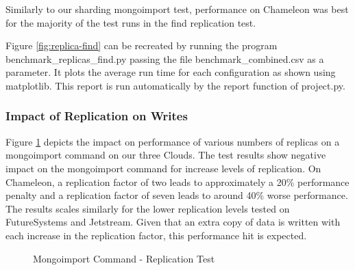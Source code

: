 \documentclass[9pt,twocolumn,twoside]{../../styles/osajnl}
\begin{document}
Similarly to our sharding mongoimport test, performance on Chameleon was best for the majority of the test runs in the find replication test.

Figure \ref{fig:replica-find} can be recreated by running the program benchmark\_replicas\_find.py passing the file benchmark\_combined.csv as a parameter.  It plots the average run time for each configuration as shown using matplotlib. This report is run automatically by the report function of project.py.



\subsubsection{Impact of Replication on Writes}



Figure \ref{fig:replica-import} depicts the impact on performance of various numbers of replicas on a mongoimport command on our three Clouds.  The test results show negative impact on the mongoimport command for increase levels of replication.  On Chameleon, a replication factor of two leads to approximately a 20\% performance penalty and a replication factor of seven leads to around 40\% worse performance.  The results scales similarly for the lower replication levels tested on FutureSystems and Jetstream.  Given that an extra copy of data is written with each increase in the replication factor, this performance hit is expected.


\begin{figure}[htbp]
\centering
{}
\caption{Mongoimport Command - Replication Test}
\label{fig:replica-import}
\end{figure}
\end{document}
